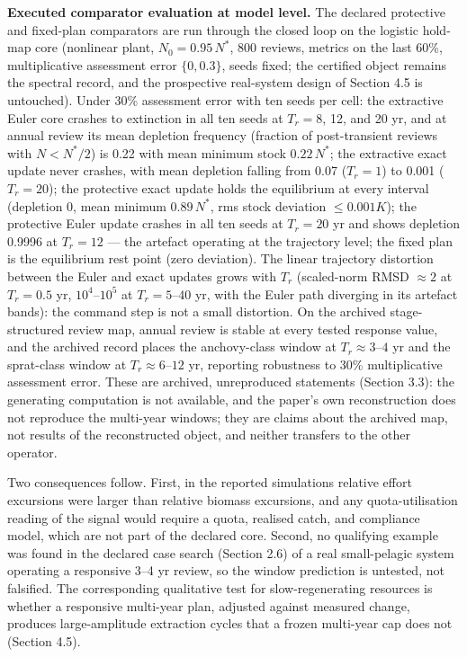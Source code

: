 \documentclass[11pt]{article}
\begin{document}
\textbf{Executed comparator evaluation at model level.} The declared
protective and fixed-plan comparators are run through the closed loop on
the logistic hold-map core (nonlinear plant, \(N_0 = 0.95\,N^*\), 800
reviews, metrics on the last 60\%, multiplicative assessment error
\(\{0, 0.3\}\), seeds fixed; the certified object remains the spectral
record, and the prospective real-system design of Section 4.5 is
untouched). Under 30\% assessment error with ten seeds per cell: the
extractive Euler core crashes to extinction in all ten seeds at
\(T_r = 8\), 12, and 20 yr, and at annual review its mean depletion
frequency (fraction of post-transient reviews with \(N < N^*/2\)) is
0.22 with mean minimum stock \(0.22\,N^*\); the extractive exact update
never crashes, with mean depletion falling from 0.07 (\(T_r = 1\)) to
0.001 (\(T_r = 20\)); the protective exact update holds the equilibrium
at every interval (depletion 0, mean minimum \(0.89\,N^*\), rms stock
deviation \(\le 0.001K\)); the protective Euler update crashes in all
ten seeds at \(T_r = 20\) yr and shows depletion 0.9996 at \(T_r = 12\)
--- the artefact operating at the trajectory level; the fixed plan is
the equilibrium rest point (zero deviation). The linear trajectory
distortion between the Euler and exact updates grows with \(T_r\)
(scaled-norm RMSD \(\approx 2\) at \(T_r = 0.5\) yr, \(10^4\)--\(10^5\)
at \(T_r = 5\)--\(40\) yr, with the Euler path diverging in its artefact
bands): the command step is not a small distortion. On the archived
stage-structured review map, annual review is stable at every tested
response value, and the archived record places the anchovy-class window
at \(T_r\approx 3\)--\(4\) yr and the sprat-class window at
\(T_r\approx 6\)--\(12\) yr, reporting robustness to 30\% multiplicative
assessment error. These are archived, unreproduced statements (Section
3.3): the generating computation is not available, and the paper's own
reconstruction does not reproduce the multi-year windows; they are
claims about the archived map, not results of the reconstructed object,
and neither transfers to the other operator.

Two consequences follow. First, in the reported simulations relative
effort excursions were larger than relative biomass excursions, and any
quota-utilisation reading of the signal would require a quota, realised
catch, and compliance model, which are not part of the declared core.
Second, no qualifying example was found in the declared case search
(Section 2.6) of a real small-pelagic system operating a responsive 3--4
yr review, so the window prediction is untested, not falsified. The
corresponding qualitative test for slow-regenerating resources is
whether a responsive multi-year plan, adjusted against measured change,
produces large-amplitude extraction cycles that a frozen multi-year cap
does not (Section 4.5).
\end{document}
